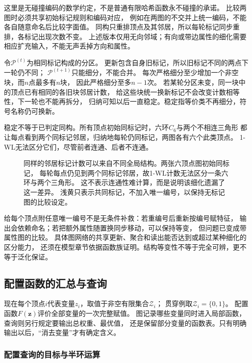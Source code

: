 这里是无碰撞编码的数学约定，不是普通有限哈希函数永不碰撞的承诺。
比较两图时必须共享初始标记规则和编码对应，
例如在两图的不交并上统一编码，不能各自随意命名后比较字面值。
同构只重排顶点及其邻居，所以每轮标记同步重排，各标记出现次数不变。
上述版本仅用无向邻域；有向或带边属性的细化需要相应扩充输入，不能无声丢掉方向和属性。

令\(\mathcal P^{(t)}\)为相同标记构成的分区。
更新包含自身旧标记，所以旧标记不同的两点下一轮仍不同；
\(\mathcal P^{(t+1)}\)只能细分，不能合并。
每次严格细分至少增加一个非空块，而\(n\)点最多有\(n\)块，
因此严格细分至多\(n-1\)次。
若某轮分区未变，同一块中的顶点已有相同的各旧块邻居计数，
给这些块统一换新标记不会改变计数相等性，下一轮也不能再拆分，
归纳可知以后一直稳定。稳定指等价类不再细分，符号名称仍可换新。

稳定不等于已判定同构。所有顶点初始同标记时，六环\(C_6\)与两个不相连三角形
都让每点看到两个同标记邻居，归纳地每轮仍同标记，两图各有六个此类顶点。
1-WL无法区分它们，尽管前者连通、后者不连通。

\begin{figure}[htbp]
  \centering
  
  \caption{同样的邻居标记计数可以来自不同全局结构。两张六顶点图初始同标记，
  每轮每点仍见到两个同标记邻居，故1-WL计数无法区分一条六环与两个三角形。
  这不表示连通性难计算，而是说明该细化遗漏了这一差异。
  浅黄只表示共同标记，不加入唯一编号，以保持无标记图的比较设定。}
  \label{fig:graph-theory-wl-local-ambiguity}
\end{figure}

给每个顶点附任意唯一编号不是无条件补救：若重编号后重新按编号赋特征，
输出会依赖命名；若把额外属性随置换同步移动，可以保持等变，
但问题已变成带属性图的比较。
具体图网络的共享更新、聚合和读出能否达到或超过某种细化的区分能力，
还须在模型章节依据函数族证明。结构等变性不等于完全可辨，更不等于泛化保证。

\subsection{配置函数的汇总与查询}
\label{sec:graph-theory-semiring-dynamic-programming}

现在每个顶点\(i\)代表变量\(z_i\)，取值于非空有限集合\(\mathcal Z_i\)；
贯穿例取\(\mathcal Z_i=\{0,1\}\)。
配置函数\(F(\bm z)\)评价全部变量的一次完整赋值。
图记录哪些变量同时进入局部函数，查询则另行规定要输出总权重、最优值，
还是保留部分变量的函数表。只有明确输出以后，“消去变量”才有确定含义。

\subsubsection{配置查询的目标与半环运算}

